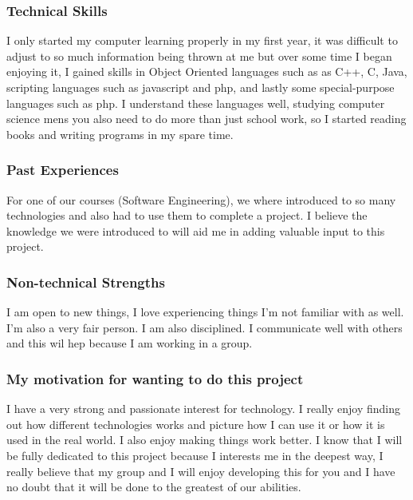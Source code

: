 \documentclass[a4paper,12pt]{article}
\begin{document}
			\subsubsection{Technical Skills}
			I only started my computer learning properly in  my first year, it was difficult to adjust to so much information being thrown at me but over some time I began enjoying it, I gained skills in Object Oriented languages such as  as C++, C, Java, scripting languages such as javascript and php, and lastly some special-purpose languages such as php. I understand these languages well, studying computer science mens you also need to do more than just school work, so I started reading books and writing programs in my spare time.
			
			\subsubsection{Past Experiences}
			For one of our courses (Software Engineering), we where introduced to so many technologies and also had to use them to complete a project. I believe the knowledge we were introduced to will aid me in adding valuable input to this project.
			
			\subsubsection{Non-technical Strengths}
			I am open to new things, I love experiencing things I'm not familiar with as well. I'm also a very fair person. I am also disciplined. I communicate well with others and this wil hep because I am working in a group.
			\subsubsection{My motivation for wanting to do this project}
			I have a very strong and passionate interest for technology. I really enjoy finding out how different technologies works and picture how I can use it or  how it is used in the real world. I also enjoy making things work better. I know that I will be fully dedicated to this project because I interests me in the deepest way, I really believe that my group and I will enjoy developing this for you and I have no doubt that it will be done to the greatest of our abilities.  
		
		\newpage
\end{document}
